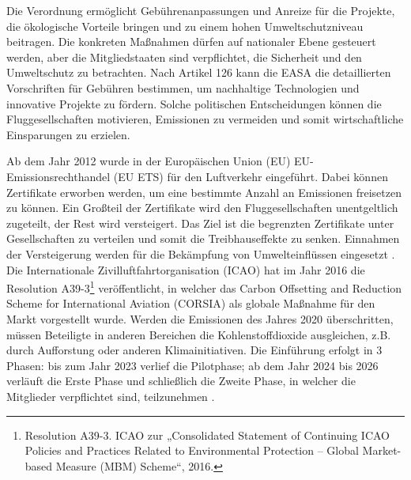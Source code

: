 Die Verordnung ermöglicht Gebührenanpassungen und Anreize für die Projekte, 
die ökologische Vorteile bringen und zu einem hohen Umweltschutzniveau beitragen.
%
Die konkreten Maßnahmen dürfen auf nationaler Ebene gesteuert werden, 
aber die Mitgliedstaaten sind verpflichtet, die Sicherheit und den Umweltschutz zu betrachten. 
Nach Artikel 126 kann die EASA die detaillierten 
Vorschriften für Gebühren bestimmen, um nachhaltige Technologien und innovative Projekte zu fördern.
%
%
Solche politischen Entscheidungen können die Fluggesellschaften motivieren, 
Emissionen zu vermeiden und somit wirtschaftliche Einsparungen zu erzielen.

Ab dem Jahr 2012 wurde in der Europäischen Union (EU) EU-Emissionsrechthandel (EU ETS) für den Luftverkehr eingeführt.
Dabei können Zertifikate erworben werden, um eine bestimmte Anzahl an Emissionen freisetzen zu können.
Ein Großteil der Zertifikate wird den Fluggesellschaften unentgeltlich zugeteilt, der Rest wird versteigert. 
Das Ziel ist die begrenzten Zertifikate unter Gesellschaften zu verteilen und somit die Treibhauseffekte zu senken.
Einnahmen der Versteigerung werden für die Bekämpfung von Umwelteinflüssen eingesetzt \cite{conrady2019luftverkehr}.
Die Internationale Zivilluftfahrtorganisation (ICAO) hat im Jahr 2016 die Resolution A39-3\footnote{Resolution A39-3. ICAO zur „Consolidated Statement of Continuing ICAO Policies and Practices Related to Environmental Protection – Global Market-based Measure (MBM) Scheme“, 2016.} veröffentlicht, 
in welcher das Carbon Offsetting and Reduction Scheme for International Aviation (CORSIA) 
als globale Maßnahme für den Markt vorgestellt wurde. 
Werden die Emissionen des Jahres 2020 überschritten, müssen Beteiligte in anderen Bereichen 
die Kohlenstoffdioxide ausgleichen, z.B. durch Aufforstung oder anderen Klimainitiativen. 
Die Einführung erfolgt in 3 Phasen: 
bis zum Jahr 2023 verlief die Pilotphase; ab dem Jahr 2024 bis 2026 verläuft die Erste Phase und schließlich die Zweite Phase, 
in welcher die Mitglieder verpflichtet sind, teilzunehmen \cite{conrady2019luftverkehr}. 


